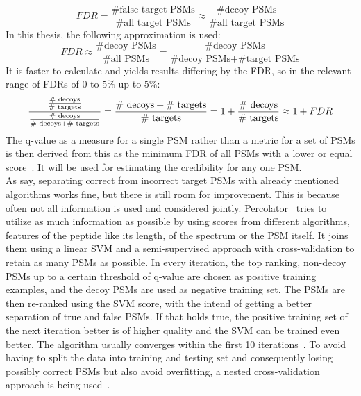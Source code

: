 \documentclass[10pt,a4paper]{article}
\begin{document}
		\begin{equation}
		FDR = \frac{\text{\# false target PSMs}}{\text{\# all target PSMs}} \approx  \frac{\text{\# decoy PSMs}}{\text{\# all target PSMs}}
		\end{equation}
		In this thesis, the following approximation is used:\\
		\begin{equation}
		FDR \approx \frac{\text{\# decoy PSMs}}{\text{\# all PSMs}} = \frac{\text{\# decoy PSMs}}{\text{\# decoy PSMs} + \text{\# target PSMs}}
		\end{equation}
		 It is faster to calculate and yields results differing by the FDR, so in the relevant range of FDRs of $0$ to $5\%$ up to $5\%$:
		\begin{equation}
		\frac{\frac{\text{\# decoys}}{\text{\# targets}}}{\frac{\text{\# decoys}}{\text{\# decoys} + \text{\# targets}}} = \frac{\text{\# decoys} + \text{\# targets}}{\text{\# targets}} \\ = 1 + \frac{\text{\# decoys}}{\text{\# targets}} \approx 1 + FDR	\end{equation}
		The q-value as a measure for a single PSM rather than a metric for a set of PSMs is then derived from this as the minimum FDR of all PSMs with a lower or equal score~\cite{Granholm2012, Aggarwal2016}. It will be used for estimating the credibility for any one PSM.\\
		As \citet{Kll2007} say, separating correct from incorrect target PSMs with already mentioned algorithms works fine, but there is still room for improvement. This is because often not all information is used and considered jointly. Percolator~\cite{Kll2007, Granholm2012} tries to utilize as much information as possible by using scores from different algorithms, features of the peptide like its length, of the spectrum or the PSM itself. It joins them using a linear SVM and a semi-supervised approach with cross-validation to retain as many PSMs as possible. In every iteration, the top ranking, non-decoy PSMs up to a certain threshold of q-value are chosen as positive training examples, and the decoy PSMs are used as negative training set. The PSMs are then re-ranked using the SVM score, with the intend of getting a better separation of true and false PSMs. If that holds true, the positive training set of the next iteration better is of higher quality and the SVM can be trained even better. The algorithm usually converges within the first 10 iterations~\cite{Kll2007}. To avoid having to split the data into training and testing set and consequently losing possibly correct PSMs but also avoid overfitting, a nested cross-validation approach is being used~\cite{Granholm2012}.
\end{document}
